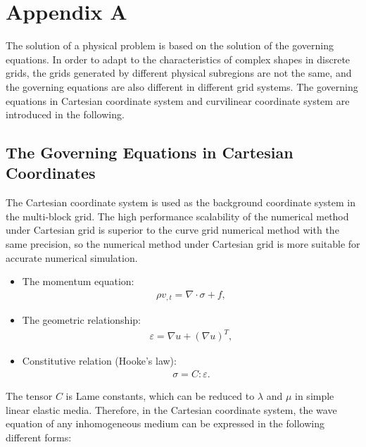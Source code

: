\chapter{Appendix A}\label{appd_equations}
The solution of a physical problem is based on the solution of the governing equations. In order to adapt to the characteristics of complex shapes in discrete grids, the grids generated by different physical subregions are not the same, and the governing equations are also different in different grid systems. The governing equations in Cartesian coordinate system and curvilinear coordinate system are introduced in the following.

\section{The Governing Equations in Cartesian Coordinates} \label{appd_equations}
The Cartesian coordinate system is used as the background coordinate system in the multi-block grid. The high performance scalability of the numerical method under Cartesian grid is superior to the curve grid numerical method with the same precision, so the numerical method under Cartesian grid is more suitable for accurate numerical simulation.
\begin{itemize}
	\item The momentum equation:	
	\begin{align}
	\rho v_{,t} = \nabla \cdot \sigma + f ,
	\end{align}
	\item The geometric relationship:
	\begin{align}
	\varepsilon = \nabla u + (\nabla u)^T ,
	\end{align}
	\item Constitutive relation (Hooke's law):
	\begin{align}
	\sigma = C : \varepsilon .
	\end{align}
\end{itemize}
The tensor $ C $ is Lame constants, which can be reduced to $ \lambda $ and $ \mu $ in simple linear elastic media. Therefore, in the Cartesian coordinate system, the wave equation of any inhomogeneous medium can be expressed in the following different forms:
